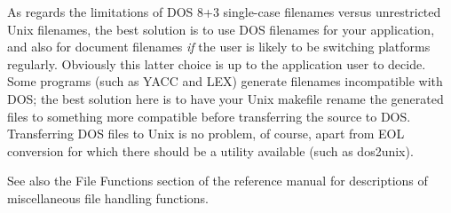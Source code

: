 As regards the limitations of DOS 8+3 single-case filenames versus
unrestricted Unix filenames, the best solution is to use DOS filenames
for your application, and also for document filenames {\it if} the user
is likely to be switching platforms regularly. Obviously this latter
choice is up to the application user to decide.  Some programs (such as
YACC and LEX) generate filenames incompatible with DOS; the best
solution here is to have your Unix makefile rename the generated files
to something more compatible before transferring the source to DOS.
Transferring DOS files to Unix is no problem, of course, apart from EOL
conversion for which there should be a utility available (such as
dos2unix).

See also the File Functions section of the reference manual for
descriptions of miscellaneous file handling functions.

